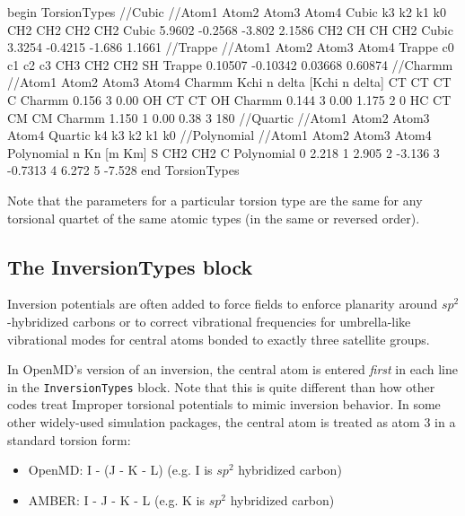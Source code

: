 \documentclass[]{book}
\begin{document}
\begin{code}[caption={[An example of a TorsionTypes block.] A
simple example of a TorsionTypes block.  Energy constants are given in
kcal / mol, and when required by the form, $\delta$ angles are given
in degrees.},
label={sch:TorsionTypes}]
begin TorsionTypes
//Cubic
//Atom1 Atom2   Atom3   Atom4   Cubic   k3       k2        k1      k0  
CH2     CH2     CH2     CH2     Cubic   5.9602   -0.2568   -3.802  2.1586
CH2     CH      CH      CH2     Cubic   3.3254   -0.4215   -1.686  1.1661
//Trappe
//Atom1 Atom2   Atom3   Atom4   Trappe  c0       c1        c2      c3
CH3     CH2     CH2     SH      Trappe  0.10507  -0.10342  0.03668 0.60874     
//Charmm
//Atom1 Atom2   Atom3   Atom4   Charmm  Kchi     n    delta  [Kchi n delta]
CT      CT      CT      C       Charmm  0.156    3    0.00
OH      CT      CT      OH      Charmm  0.144    3    0.00    1.175 2  0
HC      CT      CM      CM      Charmm  1.150    1    0.00    0.38  3 180
//Quartic
//Atom1 Atom2   Atom3   Atom4   Quartic          k4    k3    k2    k1    k0
//Polynomial
//Atom1 Atom2   Atom3   Atom4   Polynomial  n Kn     [m  Km] 
S       CH2     CH2     C       Polynomial  0 2.218   1  2.905  2 -3.136  3 -0.7313  4 6.272  5 -7.528
end TorsionTypes
\end{code}

Note that the parameters for a particular torsion type are the same
for any torsional quartet of the same atomic types (in the same or
reversed order).

\subsection{\label{section:ffInversion}The InversionTypes block}

Inversion potentials are often added to force fields to enforce
planarity around $sp^2$-hybridized carbons or to correct vibrational
frequencies for umbrella-like vibrational modes for central atoms
bonded to exactly three satellite groups.

In OpenMD's version of an inversion, the central atom is entered {\it
  first} in each line in the {\tt InversionTypes} block. Note that
this is quite different than how other codes treat Improper torsional
potentials to mimic inversion behavior.  In some other widely-used
simulation packages, the central atom is treated as atom 3 in a
standard torsion form:
\begin{itemize}
  \item OpenMD:  I - (J - K - L)  (e.g. I is $sp^2$ hybridized carbon)
  \item AMBER:   I - J - K - L   (e.g. K is $sp^2$ hybridized carbon)
\end{itemize}
\end{document}
